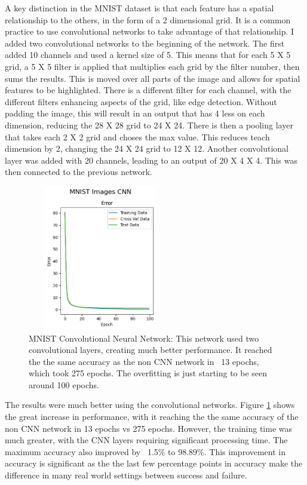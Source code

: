 \documentclass[letterpaper]{article} %
\begin{document}
A key distinction in the MNIST dataset is that each feature has a spatial relationship to the others, in the form of a 2 dimensional grid.  It is a common practice to use convolutional networks to take advantage of that relationship.  I added two convolutional networks to the beginning of the network.  The first added 10 channels and used a kernel size of 5.  This means that for each 5 X 5 grid, a 5 X 5 filter is applied that multiplies each grid by the filter number, then sums the results.  This is moved over all parts of the image and allows for spatial features to be highlighted.  There is a different filter for each channel, with the different filters enhancing aspects of the grid, like edge detection.  Without padding the image, this will result in an output that has 4 less on each dimension, reducing the 28 X 28 grid to 24 X 24.   There is then a pooling layer that takes each 2 X 2 grid and choses the max value.  This reduces teach dimension by 2, changing the 24 X 24 grid to 12 X 12.  Another convolutional layer was added with 20 channels, leading to an output of 20 X 4 X 4.  This was then connected to the previous network.

\begin{figure}[h]
\centering
\includegraphics[width=2.5in, height=2.5in]{figures/MNIST_Images_CNN_Error_MNIST.png}
\caption{MNIST Convolutional Neural Network:  This network used two convolutional layers, creating much better performance.  It reached the the same accuracy as the non CNN network in ~13 epochs, which took 275 epochs.  The overfitting is just starting to be seen around 100 epochs. }
\label{fig:MNIST_Error_MNIST_cnn}
\end{figure}

The results were much better using the convolutional networks.  Figure \ref{fig:MNIST_Error_MNIST_cnn} shows the great increase in performance, with it reaching the the same accuracy of the non CNN network in 13 epochs vs 275 epochs.  However, the training time was much greater, with the CNN layers requiring significant processing time. The maximum accuracy also improved by ~1.5\% to 98.89\%.  This improvement in accuracy is significant as the the last few percentage points in accuracy make the difference in many real world settings between success and failure. 
\end{document}
